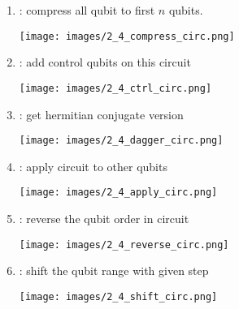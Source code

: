 \begin{enumerate}
    \item {} : compress all qubit to first $n$ qubits.\par
          \begin{minipage}{\linewidth}
              \centering
              \texttt{[image: images/2\_4\_compress\_circ.png]}
          \end{minipage}
    \item {} : add control qubits on this circuit\par
          \begin{minipage}{\linewidth}
              \centering
              \texttt{[image: images/2\_4\_ctrl\_circ.png]}
          \end{minipage}
    \item {} : get hermitian conjugate version\par
          \begin{minipage}{\linewidth}
              \centering
              \texttt{[image: images/2\_4\_dagger\_circ.png]}
          \end{minipage}
    \item {} : apply circuit to other qubits\par
          \begin{minipage}{\linewidth}
              \centering
              \texttt{[image: images/2\_4\_apply\_circ.png]}
          \end{minipage}
    \item {} : reverse the qubit order in circuit\par
          \begin{minipage}{\linewidth}
              \centering
              \texttt{[image: images/2\_4\_reverse\_circ.png]}
          \end{minipage}
    \item {} : shift the qubit range with given step\par
          \begin{minipage}{\linewidth}
              \centering
              \texttt{[image: images/2\_4\_shift\_circ.png]}
          \end{minipage}
\end{enumerate}
